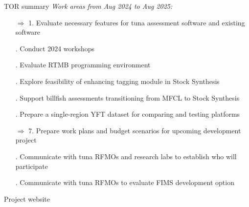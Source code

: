 \documentclass[aspectratio=169,fleqn]{beamer}
\begin{document}
\begin{frame}{\gray TOR summary}\small
  \textit{\gray\fns Work areas from Aug 2024 to Aug 2025:}\\[1ex]
  \begin{enumerate}
    \item[\orange $\Rightarrow$ 1.] Evaluate {\orange necessary features} for
    tuna assessment software and {\orange existing software}\\[1.5ex]
    \item[\gray 2.] \gray Conduct 2024 workshops\\[1.5ex]
    \item[\gray 3.] Evaluate RTMB programming environment\\[1.5ex]
    \item[\gray 4.] \gray Explore feasibility of enhancing tagging module in
    Stock Synthesis\\[1.5ex]
    \item[\gray 5.] \gray Support billfish assessments transitioning from MFCL
    to Stock Synthesis\\[1.5ex]
    \item[\gray 6.] Prepare a single-region YFT dataset for comparing and
    testing platforms\\[1.5ex]
    \item[\orange $\Rightarrow$ 7.] \black Prepare work plans and budget
    scenarios for {\orange upcoming development project}\\[1.5ex]
    \item[\gray 8.] \gray Communicate with tuna RFMOs and research labs to
    establish who will participate\\[1.5ex]
    \item[\gray 9.] Communicate with tuna RFMOs to evaluate FIMS development
    option\\[3ex]
  \end{enumerate}
\end{frame}


\begin{frame}{Project website}
  \centering\small
\end{frame}
\end{document}
